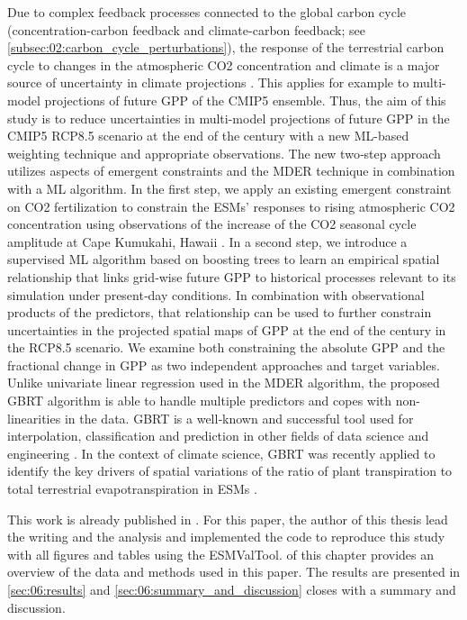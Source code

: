 Due to complex feedback processes connected to the global carbon cycle
(concentration-carbon feedback and climate-carbon feedback; see
\cref{subsec:02:carbon_cycle_perturbations}), the response of the terrestrial
carbon cycle to changes in the atmospheric \ac{CO2} concentration and climate
is a major source of uncertainty in climate projections \autocite{Bodman2013,
  Booth2012, Collins2013}. This applies for example to multi-model projections
of future \ac{GPP} of the \acs{CMIP}5 ensemble. Thus, the aim of this study is
to reduce uncertainties in multi-model projections of future \ac{GPP} in the
\acs{CMIP}5 \acs{RCP}8.5 scenario at the end of the  century with a new
\ac{ML}-based weighting technique and appropriate observations. The new
two‐step approach utilizes aspects of emergent constraints and the \ac{MDER}
technique in combination with a \ac{ML} algorithm. In the first step, we apply
an existing emergent constraint on \ac{CO2} fertilization \autocite{Wenzel2016}
to constrain the \acp{ESM}' responses to rising atmospheric \ac{CO2}
concentration using observations of the increase of the \ac{CO2} seasonal cycle
amplitude at Cape Kumukahi, Hawaii \autocite{Keeling2005}. In a second step, we
introduce a supervised \ac{ML} algorithm based on boosting trees
\autocite{Friedman2001} to learn an empirical spatial relationship that links
grid‐wise future \ac{GPP} to historical processes relevant to its simulation
under present‐day conditions. In combination with observational products of the
predictors, that relationship can be used to further constrain uncertainties in
the projected spatial maps of \ac{GPP} at the end of the  century in
the \acs{RCP}8.5 scenario. We examine both constraining the absolute \ac{GPP}
and the fractional change in \ac{GPP} as two independent approaches and target
variables. Unlike univariate linear regression used in the \ac{MDER} algorithm,
the proposed \ac{GBRT} algorithm is able to handle multiple predictors and
copes with non-linearities in the data. \ac{GBRT} is a well‐known and
successful tool used for interpolation, classification and prediction in other
fields of data science and engineering \autocite{Death2007, Elith2008}. In the
context of climate science, \ac{GBRT} was recently applied to identify the key
drivers of spatial variations of the ratio of plant transpiration to total
terrestrial evapotranspiration in \acp{ESM} \autocite{Lian2018}.

This work is already published in \textcite{Schlund2020}. For this paper, the
author of this thesis lead the writing and the analysis and implemented the
code to reproduce this study with all figures and tables using the
\ac{ESMValTool}.  of this chapter provides an
overview of the data and methods used in this paper. The results are presented
in \cref{sec:06:results} and \cref{sec:06:summary_and_discussion} closes with a
summary and discussion.


